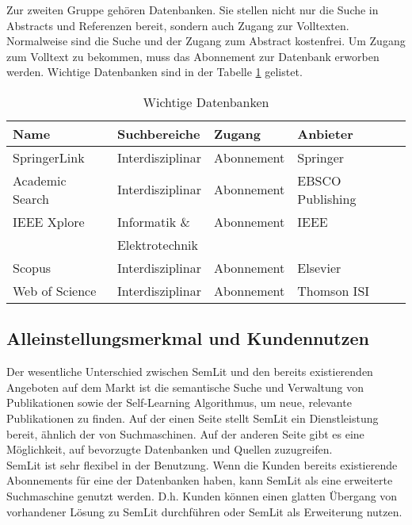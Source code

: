 Zur zweiten Gruppe gehören Datenbanken. Sie stellen nicht nur die Suche in Abstracts und Referenzen bereit, sondern auch Zugang zur Volltexten. Normalweise sind die Suche und der Zugang zum Abstract kostenfrei. Um Zugang zum Volltext zu bekommen, muss das Abonnement zur Datenbank erworben werden. Wichtige Datenbanken sind in der Tabelle \ref{tab:wettDaten} gelistet. 
\begin{table}[h!]
  \centering
    \begin{footnotesize}
  \begin{tabular}{|l|l|l|l|}\hline
  \textbf{Name} &  \textbf{Suchbereiche} &  \textbf{Zugang} &  \textbf{Anbieter} \\ \hline
 SpringerLink & Interdisziplinar & Abonnement & Springer\\ \hline
 Academic Search & Interdisziplinar & Abonnement & EBSCO Publishing\\ \hline
 IEEE Xplore & Informatik \& & Abonnement & IEEE\\ 
 & Elektrotechnik & & \\ \hline
 Scopus & Interdisziplinar & Abonnement & Elsevier\\ \hline
 Web of Science & Interdisziplinar & Abonnement & Thomson ISI \\ \hline
  \end{tabular} 
    \end{footnotesize}
  \caption{Wichtige Datenbanken}
  \label{tab:wettDaten}
\end{table} 


\subsection{Alleinstellungsmerkmal und Kundennutzen}
Der wesentliche Unterschied zwischen SemLit und den bereits existierenden Angeboten auf dem Markt ist die semantische Suche und Verwaltung von Publikationen sowie der Self-Learning Algorithmus, um neue, relevante Publikationen zu finden. Auf der einen Seite stellt SemLit ein Dienstleistung bereit, ähnlich der von Suchmaschinen. Auf der anderen Seite gibt es eine Möglichkeit, auf bevorzugte Datenbanken und Quellen zuzugreifen.\\
SemLit ist sehr flexibel in der Benutzung. Wenn die Kunden bereits existierende Abonnements für eine der Datenbanken haben, kann SemLit als eine erweiterte Suchmaschine genutzt werden. D.h. Kunden können einen glatten Übergang von vorhandener Lösung zu SemLit durchführen oder SemLit als Erweiterung nutzen. 


